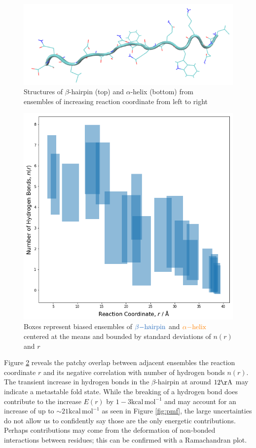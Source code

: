 \documentclass{article}[12pt]
\numberwithin{equation}{section}
\begin{document}
\begin{figure}[H]
	\includegraphics[scale=0.35]{helix-3}
\caption{Structures of $\beta$-hairpin (top) and $\alpha$-helix (bottom)
from\\ ensembles of increasing reaction coordinate from left to right}
\label{fig:unfold}
\end{figure}
\begin{figure}[H]
	\centering{}
	\captionsetup{justification=centering}
	\includegraphics[scale=0.5]{hydrogen}
\caption{Boxes represent biased ensembles of $\color{NavyBlue}{\beta\mathrm{-hairpin}}$ and
$\color{orange}{\alpha\mathrm{-helix}}$\\centered at the means and bounded by standard
deviations of $n(r)$ and $r$}
\label{fig:hydrogen}
\end{figure}
\pagebreak
Figure \ref{fig:hydrogen} reveals the patchy overlap between adjacent ensembles
the reaction coordinate $r$ and its negative correlation with number of hydrogen
bonds $n(r)$. The transient increase in hydrogen bonds in the $\beta$-hairpin at
around $12\mathrm{\AA}$ may indicate a metastable fold state. While the breaking
of a hydrogen bond does contribute to the increase $E(r)$ by
$1-3\mathrm{kcal\,mol^{-1}}$ and may account for an increase of up to
$\sim21\mathrm{kcal\,mol^{-1}}$ as seen in Figure \ref{fig:pmf}, the large
uncertainties do not allow us to confidently say those are the only energetic
contributions. Perhaps contributions may come from the deformation of non-bonded
interactions between residues; this can be confirmed with a Ramachandran plot.
\end{document}

